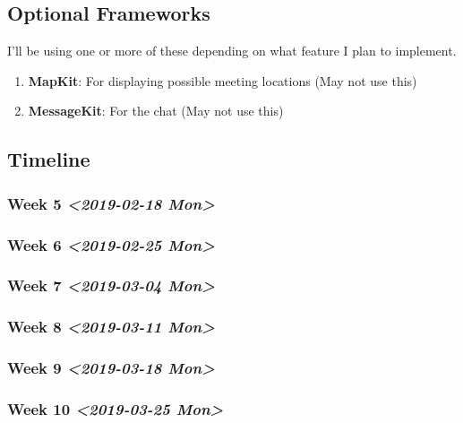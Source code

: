 \documentclass[11pt]{article}
\begin{document}
\subsection{Optional Frameworks}
\label{sec:org2af2e33}

I'll be using one or more of these depending on what feature I plan to implement. 

\begin{enumerate}
\item \textbf{MapKit}: For displaying possible meeting locations (May not use this)
\item \textbf{MessageKit}: For the chat (May not use this)
\end{enumerate}

\subsection{Timeline}
\label{sec:orgd1ab4b1}

\subsubsection{Week 5 \textit{<2019-02-18 Mon>}}
\label{sec:org928ee12}
\subsubsection{Week 6 \textit{<2019-02-25 Mon>}}
\label{sec:orgd74daba}
\subsubsection{Week 7 \textit{<2019-03-04 Mon>}}
\label{sec:org47207e2}
\subsubsection{Week 8 \textit{<2019-03-11 Mon>}}
\label{sec:org1f8efe0}
\subsubsection{Week 9 \textit{<2019-03-18 Mon>}}
\label{sec:org5a958c0}
\subsubsection{Week 10 \textit{<2019-03-25 Mon>}}
\label{sec:org445f899}
\end{document}
